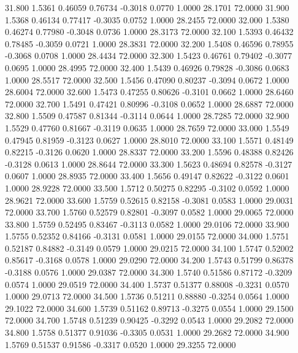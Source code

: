  31.800   1.5361   0.46059   0.76734  -0.3018   0.0770   1.0000  28.1701  72.0000
  31.900   1.5368   0.46134   0.77417  -0.3035   0.0752   1.0000  28.2455  72.0000
  32.000   1.5380   0.46274   0.77980  -0.3048   0.0736   1.0000  28.3173  72.0000
  32.100   1.5393   0.46432   0.78485  -0.3059   0.0721   1.0000  28.3831  72.0000
  32.200   1.5408   0.46596   0.78955  -0.3068   0.0708   1.0000  28.4434  72.0000
  32.300   1.5423   0.46761   0.79402  -0.3077   0.0695   1.0000  28.4995  72.0000
  32.400   1.5439   0.46926   0.79828  -0.3086   0.0683   1.0000  28.5517  72.0000
  32.500   1.5456   0.47090   0.80237  -0.3094   0.0672   1.0000  28.6004  72.0000
  32.600   1.5473   0.47255   0.80626  -0.3101   0.0662   1.0000  28.6460  72.0000
  32.700   1.5491   0.47421   0.80996  -0.3108   0.0652   1.0000  28.6887  72.0000
  32.800   1.5509   0.47587   0.81344  -0.3114   0.0644   1.0000  28.7285  72.0000
  32.900   1.5529   0.47760   0.81667  -0.3119   0.0635   1.0000  28.7659  72.0000
  33.000   1.5549   0.47945   0.81959  -0.3123   0.0627   1.0000  28.8010  72.0000
  33.100   1.5571   0.48149   0.82215  -0.3126   0.0620   1.0000  28.8337  72.0000
  33.200   1.5596   0.48388   0.82426  -0.3128   0.0613   1.0000  28.8644  72.0000
  33.300   1.5623   0.48694   0.82578  -0.3127   0.0607   1.0000  28.8935  72.0000
  33.400   1.5656   0.49147   0.82622  -0.3122   0.0601   1.0000  28.9228  72.0000
  33.500   1.5712   0.50275   0.82295  -0.3102   0.0592   1.0000  28.9621  72.0000
  33.600   1.5759   0.52615   0.82158  -0.3081   0.0583   1.0000  29.0031  72.0000
  33.700   1.5760   0.52579   0.82801  -0.3097   0.0582   1.0000  29.0065  72.0000
  33.800   1.5759   0.52495   0.83467  -0.3113   0.0582   1.0000  29.0106  72.0000
  33.900   1.5755   0.52352   0.84166  -0.3131   0.0581   1.0000  29.0155  72.0000
  34.000   1.5751   0.52187   0.84882  -0.3149   0.0579   1.0000  29.0215  72.0000
  34.100   1.5747   0.52002   0.85617  -0.3168   0.0578   1.0000  29.0290  72.0000
  34.200   1.5743   0.51799   0.86378  -0.3188   0.0576   1.0000  29.0387  72.0000
  34.300   1.5740   0.51586   0.87172  -0.3209   0.0574   1.0000  29.0519  72.0000
  34.400   1.5737   0.51377   0.88008  -0.3231   0.0570   1.0000  29.0713  72.0000
  34.500   1.5736   0.51211   0.88880  -0.3254   0.0564   1.0000  29.1022  72.0000
  34.600   1.5739   0.51162   0.89713  -0.3275   0.0554   1.0000  29.1500  72.0000
  34.700   1.5748   0.51239   0.90425  -0.3292   0.0543   1.0000  29.2082  72.0000
  34.800   1.5758   0.51377   0.91036  -0.3305   0.0531   1.0000  29.2682  72.0000
  34.900   1.5769   0.51537   0.91586  -0.3317   0.0520   1.0000  29.3255  72.0000
